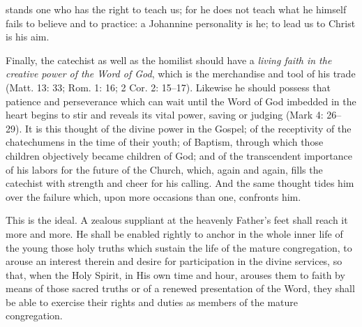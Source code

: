 stands one who has the right to teach us; for he does not teach what he himself fails to believe and to practice: a Johannine personality is he; to lead us to Christ is his aim.

Finally, the catechist as well as the homilist should have a \emph{living faith in the creative power of the Word of God}, which is the merchandise and tool of his trade (Matt. 13: 33; Rom. 1: 16; 2 Cor. 2: 15–17). Likewise he should possess that patience and perseverance which can wait until the Word of God imbedded in the heart begins to stir and reveals its vital power, saving or judging (Mark 4: 26–29). It is this thought of the divine power in the Gospel; of the receptivity of the chatechumens in the time of their youth; of Baptism, through which those children objectively became children of God; and of the transcendent importance of his labors for the future of the Church, which, again and again, fills the catechist with strength and cheer for his calling. And the same thought tides him over the failure which, upon more occasions than one, confronts him.

This is the ideal. A zealous suppliant at the heavenly Father’s feet shall reach it more and more. He shall be enabled rightly to anchor in the whole inner life of the young those holy truths which sustain the life of the mature congregation, to arouse an interest therein and desire for participation in the divine services, so that, when the Holy Spirit, in His own time and hour, arouses them to faith by means of those sacred truths or of a renewed presentation of the Word, they shall be able to exercise their rights and duties as members of the mature congregation.

